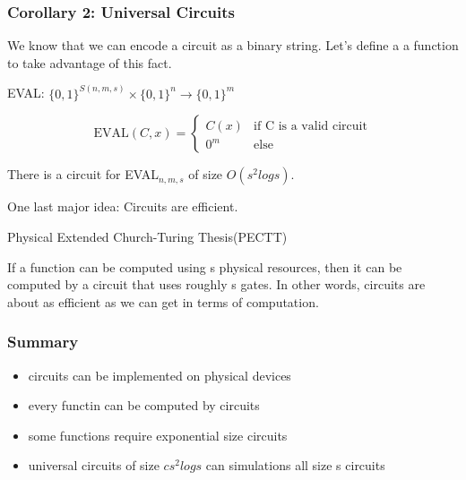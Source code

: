 \hr

\subsubsection*{Corollary 2: Universal Circuits}

We know that we can encode a circuit as a binary string. Let's define a a function to take advantage of this fact.

\begin{definition}    
    EVAL: $\{0, 1\}^{S(n, m, s)} \times \{0,1\}^n \rightarrow \{0,1\}^m$

    \begin{equation}
        \text{EVAL}(C, x) = 
        \begin{cases}
            C(x) & \text{if C is a valid circuit} \\
            0^m & \text{else}
        \end{cases}
    \end{equation}
\end{definition}

\begin{theorem}
    There is a circuit for EVAL$_{n, m, s}$ of size $O(s^2logs)$.
\end{theorem}

\hr

One last major idea: Circuits are efficient.

\begin{theorem}
    Physical Extended Church-Turing Thesis(PECTT)

    If a function can be computed using s physical resources, then it can be computed by a circuit that uses roughly s gates. In other words, circuits are about as efficient as we can get in terms of computation.    
\end{theorem}


\subsubsection*{Summary}
\begin{itemize}
    \item circuits can be implemented on physical devices
    \item every functin can be computed by circuits
    \item some functions require exponential size circuits
    \item universal circuits of size $cs^2logs$ can simulations all size s circuits
\end{itemize}







